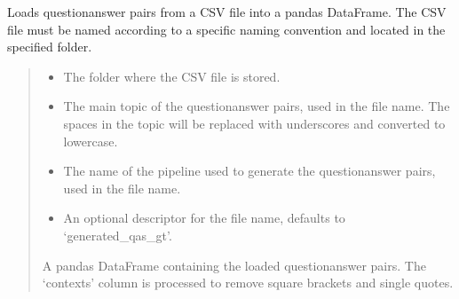 \documentclass[letterpaper,10pt,english,openany,oneside]{sphinxmanual}
\begin{document}
\begin{fulllineitems}
\label{\detokenize{utils:tools.pipeline.load_qa_pairs}}
\pysigstartsignatures
{}
\pysigstopsignatures
\sphinxAtStartPar
Loads question\sphinxhyphen{}answer pairs from a CSV file into a pandas DataFrame. The CSV file must be
named according to a specific naming convention and located in the specified folder.
\begin{quote}\begin{description}
\begin{itemize}
\item {} 
\sphinxAtStartPar
{} \textendash{} The folder where the CSV file is stored.

\item {} 
\sphinxAtStartPar
{} \textendash{} The main topic of the question\sphinxhyphen{}answer pairs, used in the file name.
The spaces in the topic will be replaced with underscores and converted to lowercase.

\item {} 
\sphinxAtStartPar
{} \textendash{} The name of the pipeline used to generate the question\sphinxhyphen{}answer pairs,
used in the file name.

\item {} 
\sphinxAtStartPar
{} \textendash{} An optional descriptor for the file name, defaults to ‘generated\_qas\_gt’.

\end{itemize}

\sphinxAtStartPar
A pandas DataFrame containing the loaded question\sphinxhyphen{}answer pairs. The ‘contexts’ column
is processed to remove square brackets and single quotes.

\end{description}\end{quote}

\end{fulllineitems}
\end{document}
